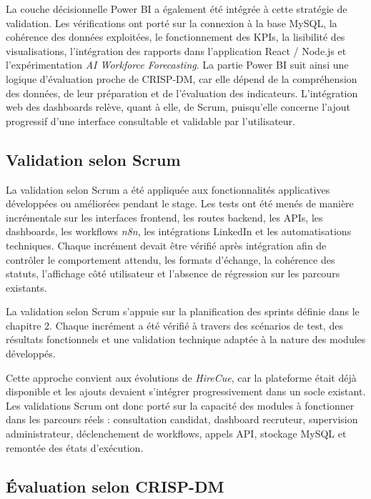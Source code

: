 La couche décisionnelle Power BI a également été intégrée à cette stratégie de validation. Les vérifications ont porté sur la connexion à la base MySQL, la cohérence des données exploitées, le fonctionnement des KPIs, la lisibilité des visualisations, l'intégration des rapports dans l'application React / Node.js et l'expérimentation \textit{AI Workforce Forecasting}. La partie Power BI suit ainsi une logique d'évaluation proche de CRISP-DM, car elle dépend de la compréhension des données, de leur préparation et de l'évaluation des indicateurs. L'intégration web des dashboards relève, quant à elle, de Scrum, puisqu'elle concerne l'ajout progressif d'une interface consultable et validable par l'utilisateur.

\subsection{Validation selon Scrum}

La validation selon Scrum a été appliquée aux fonctionnalités applicatives développées ou améliorées pendant le stage. Les tests ont été menés de manière incrémentale sur les interfaces frontend, les routes backend, les APIs, les dashboards, les workflows \textit{n8n}, les intégrations LinkedIn et les automatisations techniques. Chaque incrément devait être vérifié après intégration afin de contrôler le comportement attendu, les formats d'échange, la cohérence des statuts, l'affichage côté utilisateur et l'absence de régression sur les parcours existants.

La validation selon Scrum s'appuie sur la planification des sprints définie dans le chapitre 2. Chaque incrément a été vérifié à travers des scénarios de test, des résultats fonctionnels et une validation technique adaptée à la nature des modules développés.

Cette approche convient aux évolutions de \textit{HireCue}, car la plateforme était déjà disponible et les ajouts devaient s'intégrer progressivement dans un socle existant. Les validations Scrum ont donc porté sur la capacité des modules à fonctionner dans les parcours réels : consultation candidat, dashboard recruteur, supervision administrateur, déclenchement de workflows, appels API, stockage MySQL et remontée des états d'exécution.

\subsection{Évaluation selon CRISP-DM}

